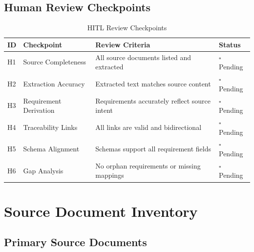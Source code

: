 \documentclass[11pt,a4paper]{article}
\begin{document}
\subsection{Human Review Checkpoints}

\begin{table}[h]
\centering
\caption{HITL Review Checkpoints}
\begin{tabular}{@{}C{1cm}L{4cm}L{6cm}C{2.5cm}@{}}
\toprule
\textbf{ID} & \textbf{Checkpoint} & \textbf{Review Criteria} & \textbf{Status} \\
\midrule
H1 & Source Completeness & All source documents listed and extracted & $\square$ Pending \\
H2 & Extraction Accuracy & Extracted text matches source content & $\square$ Pending \\
H3 & Requirement Derivation & Requirements accurately reflect source intent & $\square$ Pending \\
H4 & Traceability Links & All links are valid and bidirectional & $\square$ Pending \\
H5 & Schema Alignment & Schemas support all requirement fields & $\square$ Pending \\
H6 & Gap Analysis & No orphan requirements or missing mappings & $\square$ Pending \\
\bottomrule
\end{tabular}
\end{table}


\newpage
\section{Source Document Inventory}

\subsection{Primary Source Documents}
\end{document}
